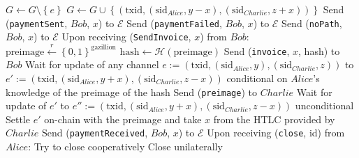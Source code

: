 \begin{algorithmic}[1]
          \State $G \leftarrow G \setminus \left\{e\right\}$
          \State $G \leftarrow G \cup \left\{\left(\mathrm{txid},
          \left(\mathrm{sid}_{Alice}, y - x\right), \left(\mathrm{sid}_{Charlie}, z +
          x\right)\right)\right\}$
          \State Send (\texttt{paymentSent}, $Bob$, $x$) to $\mathcal{E}$
        \Else
          \State Send (\texttt{paymentFailed}, $Bob$, $x$) to $\mathcal{E}$
        \EndIf
      \Else
        \State Send (\texttt{noPath}, $Bob$, $x$) to $\mathcal{E}$
      \EndIf
    \State
    \State Upon receiving (\texttt{SendInvoice}, $x$) from $Bob$:
      \State $\mathrm{preimage} \overset{r}{\leftarrow}
      \left\{0,1\right\}^{\mathrm{gazillion}}$
      \State $\mathrm{hash} \leftarrow \mathcal{H}\left(\mathrm{preimage}\right)$
      \State Send (\texttt{invoice}, $x$, hash) to $Bob$
      \State Wait for update of any channel $e := \left(\mathrm{txid},
      \left(\mathrm{sid}_{Alice}, y\right), \left(\mathrm{sid}_{Charlie}, z\right)\right)$
      to $e' := \left(\mathrm{txid}, \left(\mathrm{sid}_{Alice}, y + x\right),
      \left(\mathrm{sid}_{Charlie}, z - x\right)\right)$ conditional on $Alice$'s
      knowledge of the preimage of the hash
      \State Send (\texttt{preimage}) to $Charlie$
      \State Wait for update of $e'$ to $e'' := \left(\mathrm{txid},
      \left(\mathrm{sid}_{Alice}, y + x\right), \left(\mathrm{sid}_{Charlie}, z -
      x\right)\right)$ unconditional
        \State Settle $e'$ on-chain with the preimage and take $x$ from the HTLC provided
        by $Charlie$
      \EndIf
      \State Send (\texttt{paymentReceived}, $Bob$, $x$) to $\mathcal{E}$
    \State
    \State Upon receiving (\texttt{close}, id) from $Alice$:
        \State Try to close cooperatively 
         
          \State Close unilaterally 
        \EndIf
      \EndIf
  \end{algorithmic}
\hrulefill
\ \\ 
  \label{alg:temp:formalfledger}
